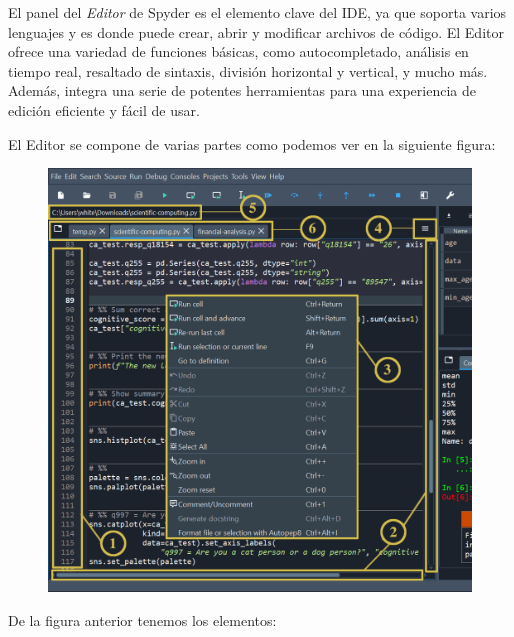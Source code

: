 El panel del \textit{Editor} de Spyder es el elemento clave del IDE, ya que soporta varios lenguajes y es donde puede crear, abrir y modificar archivos de código. El Editor ofrece una variedad de funciones básicas, como autocompletado, análisis en tiempo real, resaltado de sintaxis, división horizontal y vertical, y mucho más. Además, integra una serie de potentes herramientas para una experiencia de edición eficiente y fácil de usar.
\par
El Editor se compone de varias partes como podemos ver en la siguiente figura:
\begin{figure}[H]
    \centering
    \includegraphics[scale=0.25]{Imagenes/Guia_IDE_11.png}
\end{figure}
De la figura anterior tenemos los elementos:
